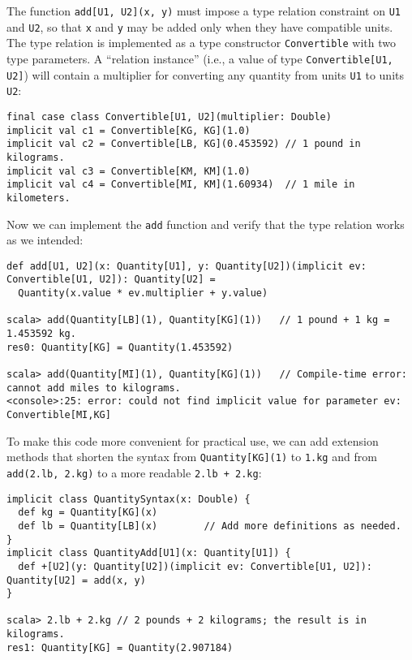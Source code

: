 The function \lstinline!add[U1, U2](x, y)! must impose a type relation
constraint on \lstinline!U1! and \lstinline!U2!, so that \lstinline!x!
and \lstinline!y! may be added only when they have compatible units.
The type relation is implemented as a type constructor \lstinline!Convertible!
with two type parameters. A \textsf{``}relation instance\textsf{''} (i.e., a value
of type \lstinline!Convertible[U1, U2]!) will contain a multiplier
for converting any quantity from units \lstinline!U1! to units \lstinline!U2!:
\begin{lstlisting}
final case class Convertible[U1, U2](multiplier: Double)
implicit val c1 = Convertible[KG, KG](1.0)
implicit val c2 = Convertible[LB, KG](0.453592) // 1 pound in kilograms.
implicit val c3 = Convertible[KM, KM](1.0)
implicit val c4 = Convertible[MI, KM](1.60934)  // 1 mile in kilometers.
\end{lstlisting}
Now we can implement the \lstinline!add! function and verify that
the type relation works as we intended:
\begin{lstlisting}
def add[U1, U2](x: Quantity[U1], y: Quantity[U2])(implicit ev: Convertible[U1, U2]): Quantity[U2] =
  Quantity(x.value * ev.multiplier + y.value)

scala> add(Quantity[LB](1), Quantity[KG](1))   // 1 pound + 1 kg = 1.453592 kg.
res0: Quantity[KG] = Quantity(1.453592)

scala> add(Quantity[MI](1), Quantity[KG](1))   // Compile-time error: cannot add miles to kilograms.
<console>:25: error: could not find implicit value for parameter ev: Convertible[MI,KG]
\end{lstlisting}

To make this code more convenient for practical use, we can add extension
methods that shorten the syntax from \lstinline!Quantity[KG](1)!
to \lstinline!1.kg! and from \lstinline!add(2.lb, 2.kg)! to a more
readable \lstinline!2.lb + 2.kg!:
\begin{lstlisting}
implicit class QuantitySyntax(x: Double) {
  def kg = Quantity[KG](x)
  def lb = Quantity[LB](x)        // Add more definitions as needed.
}
implicit class QuantityAdd[U1](x: Quantity[U1]) {
  def +[U2](y: Quantity[U2])(implicit ev: Convertible[U1, U2]): Quantity[U2] = add(x, y)
}

scala> 2.lb + 2.kg // 2 pounds + 2 kilograms; the result is in kilograms.
res1: Quantity[KG] = Quantity(2.907184)
\end{lstlisting}

